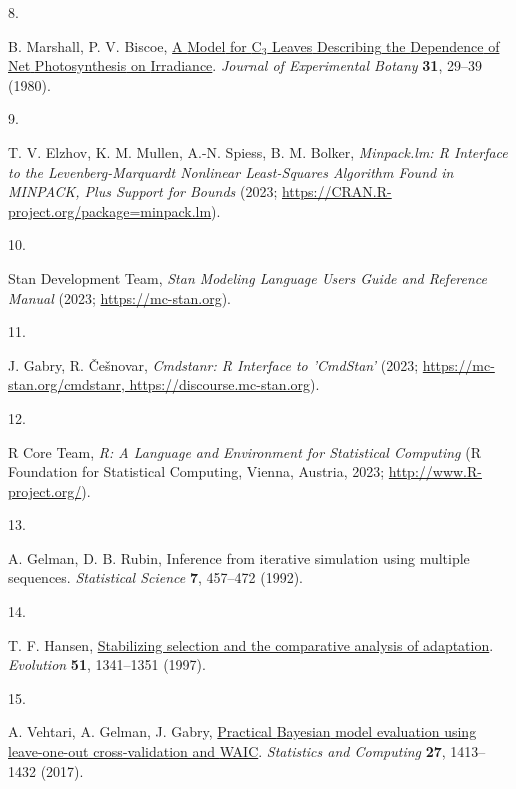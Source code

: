 \documentclass[
  letterpaper,
  DIV=11,
  numbers=noendperiod]{scrartcl}
\newlength{\cslhangindent}
\newlength{\csllabelwidth}
\newenvironment{CSLReferences}[2] %
 {\begin{list}{}{%
  \setlength{\itemindent}{0pt}
  \setlength{\leftmargin}{0pt}
  \setlength{\parsep}{0pt}
  \ifodd #1
   \setlength{\leftmargin}{\cslhangindent}
   \setlength{\itemindent}{-1\cslhangindent}
  \fi
  \setlength{\itemsep}{#2\baselineskip}}}
 {\end{list}}
\newcommand{\CSLLeftMargin}[1]{\parbox[t]{\csllabelwidth}{\strut#1\strut}}
\newcommand{\CSLRightInline}[1]{\parbox[t]{\linewidth - \csllabelwidth}{\strut#1\strut}}
\begin{document}
\begin{CSLReferences}{0}{1}
\CSLLeftMargin{8. }%
\CSLRightInline{B. Marshall, P. V. Biscoe,
\href{https://doi.org/10.1093/jxb/31.1.29}{A {Model} for
{C}\(_{\textrm{3}}\) {Leaves} {Describing} the {Dependence} of {Net}
{Photosynthesis} on {Irradiance}}. \emph{Journal of Experimental Botany}
\textbf{31}, 29--39 (1980).}

\CSLLeftMargin{9. }%
\CSLRightInline{T. V. Elzhov, K. M. Mullen, A.-N. Spiess, B. M. Bolker,
\emph{Minpack.lm: {R} {Interface} to the {Levenberg}-{Marquardt}
{Nonlinear} {Least}-{Squares} {Algorithm} {Found} in {MINPACK}, {Plus}
{Support} for {Bounds}} (2023;
\url{https://CRAN.R-project.org/package=minpack.lm}).}

\CSLLeftMargin{10. }%
\CSLRightInline{Stan Development Team, \emph{Stan {Modeling} {Language}
{Users} {Guide} and {Reference} {Manual}} (2023;
\url{https://mc-stan.org}).}

\CSLLeftMargin{11. }%
\CSLRightInline{J. Gabry, R. Češnovar, \emph{Cmdstanr: {R} {Interface}
to '{CmdStan}'} (2023;
\href{https://mc-stan.org/cmdstanr,\%20https://discourse.mc-stan.org}{https://mc-stan.org/cmdstanr,
https://discourse.mc-stan.org}).}

\CSLLeftMargin{12. }%
\CSLRightInline{R Core Team, \emph{R: {A} {Language} and {Environment}
for {Statistical} {Computing}} (R Foundation for Statistical Computing,
Vienna, Austria, 2023; \url{http://www.R-project.org/}).}

\CSLLeftMargin{13. }%
\CSLRightInline{A. Gelman, D. B. Rubin, Inference from iterative
simulation using multiple sequences. \emph{Statistical Science}
\textbf{7}, 457--472 (1992).}

\CSLLeftMargin{14. }%
\CSLRightInline{T. F. Hansen,
\href{https://doi.org/10.1111/j.1558-5646.1997.tb01457.x}{Stabilizing
selection and the comparative analysis of adaptation}. \emph{Evolution}
\textbf{51}, 1341--1351 (1997).}

\CSLLeftMargin{15. }%
\CSLRightInline{A. Vehtari, A. Gelman, J. Gabry,
\href{https://doi.org/10.1007/s11222-016-9696-4}{Practical {Bayesian}
model evaluation using leave-one-out cross-validation and {WAIC}}.
\emph{Statistics and Computing} \textbf{27}, 1413--1432 (2017).}

\end{CSLReferences}
\end{document}
